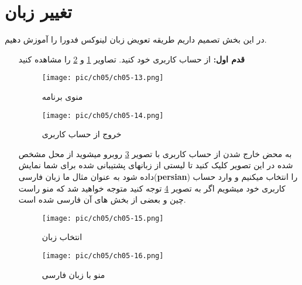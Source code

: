 \section{تغییر زبان}\label{se-43}
در این بخش تصمیم داریم طریقه تعویض زبان لینوکس فدورا را آموزش دهیم.
\begin{enumerate}
	\item[\textbf{قدم اول:}] 
از حساب کاربری خود
\textbf{}
کنید. تصاویر
\ref{pic-49}
و
\ref{pic-50}
را مشاهده کنید
	
\begin{figure}[H]%
	\caption{منوی برنامه}
	\begin{center}
		\texttt{[image: pic/ch05/ch05-13.png]}
	\end{center}
	\label{pic-49}
\end{figure}
\begin{figure}[H]%
	\caption{خروج از حساب کاربری}
	\begin{center}
		\texttt{[image: pic/ch05/ch05-14.png]}
	\end{center}
	\label{pic-50}
\end{figure}
به محض خارج شدن از حساب کاربری با تصویر
\ref{pic-51}
روبرو میشوید از محل مشخص شده در این تصویر کلیک کنید تا لیستی از زبانهای پشتیبانی شده برای شما نمایش داده شود به عنوان مثال ما زبان فارسی(\textbf{persian}) را انتخاب میکنیم و وارد حساب کاربری خود میشویم اگر به تصویر 
\ref{pic-52}
توجه کنید متوجه خواهید شد که منو راست چین و بعضی از بخش های آن فارسی شده است.
\begin{figure}[H]%
	\caption{انتخاب زبان}
	\begin{center}
		\texttt{[image: pic/ch05/ch05-15.png]}
	\end{center}
	\label{pic-51}
\end{figure}
\begin{figure}[H]%
	\caption{منو با زبان فارسی}
	\begin{center}
		\texttt{[image: pic/ch05/ch05-16.png]}
	\end{center}
	\label{pic-52}
\end{figure}
\end{enumerate}
